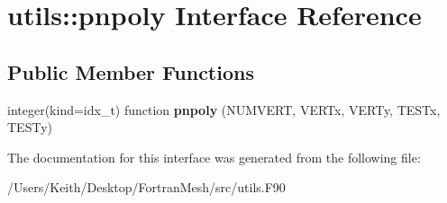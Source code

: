 \hypertarget{interfaceutils_1_1pnpoly}{}\section{utils\+:\+:pnpoly Interface Reference}
\label{interfaceutils_1_1pnpoly}
\subsection*{Public Member Functions}
\begin{DoxyCompactItemize}
\item 
integer(kind=idx\+\_\+t) function {\bfseries pnpoly} (N\+U\+M\+V\+E\+RT, V\+E\+R\+Tx, V\+E\+R\+Ty, T\+E\+S\+Tx, T\+E\+S\+Ty)\hypertarget{interfaceutils_1_1pnpoly_ae2d9ade6dfe0a92b530da29c2a818baf}{}\label{interfaceutils_1_1pnpoly_ae2d9ade6dfe0a92b530da29c2a818baf}

\end{DoxyCompactItemize}


The documentation for this interface was generated from the following file\+:\begin{DoxyCompactItemize}
\item 
/\+Users/\+Keith/\+Desktop/\+Fortran\+Mesh/src/utils.\+F90\end{DoxyCompactItemize}
